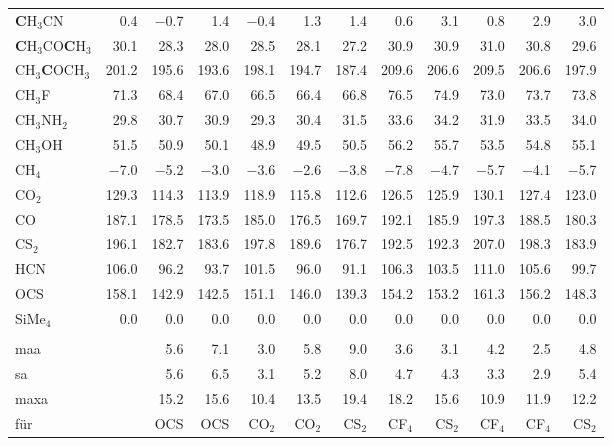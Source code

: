 \begin{table}[ht!]
{\begin{tabular}{lr|rrrrr|rrrrr}
    \textbf{C}H$_{3}$CN & 0.4   & $-$0.7  & 1.4   & $-$0.4  & 1.3   & 1.4   & 0.6   & 3.1   & 0.8   & 2.9   & 3.0 \\
    \textbf{C}H$_{3}$CO\textbf{C}H$_{3}$ & 30.1  & 28.3  & 28.0  & 28.5  & 28.1  & 27.2  & 30.9  & 30.9  & 31.0  & 30.8  & 29.6 \\
    CH$_{3}$\textbf{C}OCH$_{3}$ & 201.2 & 195.6 & 193.6 & 198.1 & 194.7 & 187.4 & 209.6 & 206.6 & 209.5 & 206.6 & 197.9 \\
    CH$_{3}$F  & 71.3  & 68.4  & 67.0  & 66.5  & 66.4  & 66.8  & 76.5  & 74.9  & 73.0  & 73.7  & 73.8 \\
    CH$_{3}$NH$_{2}$ & 29.8  & 30.7  & 30.9  & 29.3  & 30.4  & 31.5  & 33.6  & 34.2  & 31.9  & 33.5  & 34.0 \\
    CH$_{3}$OH & 51.5  & 50.9  & 50.1  & 48.9  & 49.5  & 50.5  & 56.2  & 55.7  & 53.5  & 54.8  & 55.1 \\
    CH$_{4}$   & $-$7.0  & $-$5.2  & $-$3.0  & $-$3.6  & $-$2.6  & $-$3.8  & $-$7.8  & $-$4.7  & $-$5.7  & $-$4.1  & $-$5.7 \\
    CO$_{2}$   & 129.3 & 114.3 & 113.9 & 118.9 & 115.8 & 112.6 & 126.5 & 125.9 & 130.1 & 127.4 & 123.0 \\
    CO    & 187.1 & 178.5 & 173.5 & 185.0 & 176.5 & 169.7 & 192.1 & 185.9 & 197.3 & 188.5 & 180.3 \\
    CS$_{2}$   & 196.1 & 182.7 & 183.6 & 197.8 & 189.6 & 176.7 & 192.5 & 192.3 & 207.0 & 198.3 & 183.9 \\
    HCN   & 106.0 & 96.2  & 93.7  & 101.5 & 96.0  & 91.1  & 106.3 & 103.5 & 111.0 & 105.6 & 99.7 \\
    OCS   & 158.1 & 142.9 & 142.5 & 151.1 & 146.0 & 139.3 & 154.2 & 153.2 & 161.3 & 156.2 & 148.3 \\
    SiMe$_{4}$ & 0.0   & 0.0   & 0.0   & 0.0   & 0.0   & 0.0   & 0.0   & 0.0   & 0.0   & 0.0   & 0.0 \\
          &       &       &       &       &       &       &       &       &       &       &  \\
    \ac{maa}   &       & 5.6   & 7.1   & 3.0   & 5.8   & 9.0   & 3.6   & 3.1   & 4.2   & 2.5   & 4.8 \\
    \ac{sa}   &       & 5.6   & 6.5   & 3.1   & 5.2   & 8.0   & 4.7   & 4.3   & 3.3   & 2.9   & 5.4 \\
    \ac{maxa}  &       & 15.2  & 15.6  & 10.4  & 13.5  & 19.4  & 18.2  & 15.6  & 10.9  & 11.9  & 12.2 \\
    für   &       & OCS   & OCS   & CO$_{2}$   & CO$_{2}$   & CS$_{2}$   & CF$_{4}$   & CS$_{2}$   & CF$_{4}$   & CF$_{4}$   & CS$_{2}$ \\
    \end{tabular}%
  \label{tab:cshifts}}%
\end{table}%
